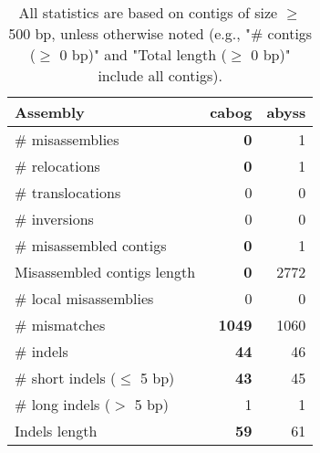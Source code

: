 \documentclass[12pt,a4paper]{article}
\begin{document}
\begin{table}[ht]
\begin{center}
\caption{All statistics are based on contigs of size $\geq$ 500 bp, unless otherwise noted (e.g., "\# contigs ($\geq$ 0 bp)" and "Total length ($\geq$ 0 bp)" include all contigs).}
\begin{tabular}{|l*{2}{|r}|}
\hline
Assembly & cabog & abyss \\ \hline
\# misassemblies & {\bf 0} & 1 \\ \hline
\hspace{5mm}\# relocations & {\bf 0} & 1 \\ \hline
\hspace{5mm}\# translocations & 0 & 0 \\ \hline
\hspace{5mm}\# inversions & 0 & 0 \\ \hline
\# misassembled contigs & {\bf 0} & 1 \\ \hline
Misassembled contigs length & {\bf 0} & 2772 \\ \hline
\# local misassemblies & 0 & 0 \\ \hline
\# mismatches & {\bf 1049} & 1060 \\ \hline
\# indels & {\bf 44} & 46 \\ \hline
\hspace{5mm}\# short indels ($\leq$ 5 bp) & {\bf 43} & 45 \\ \hline
\hspace{5mm}\# long indels ($>$ 5 bp) & 1 & 1 \\ \hline
Indels length & {\bf 59} & 61 \\ \hline
\end{tabular}
\end{center}
\end{table}
\end{document}
